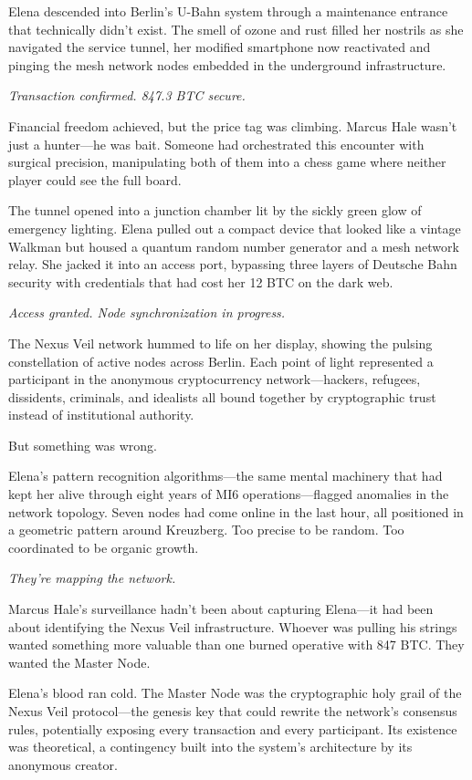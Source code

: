 \documentclass[12pt,letterpaper]{book}
\begin{document}
Elena descended into Berlin's U-Bahn system through a maintenance entrance that technically didn't exist. The smell of ozone and rust filled her nostrils as she navigated the service tunnel, her modified smartphone now reactivated and pinging the mesh network nodes embedded in the underground infrastructure.

\emph{Transaction confirmed. 847.3 BTC secure.}

Financial freedom achieved, but the price tag was climbing. Marcus Hale wasn't just a hunter---he was bait. Someone had orchestrated this encounter with surgical precision, manipulating both of them into a chess game where neither player could see the full board.

The tunnel opened into a junction chamber lit by the sickly green glow of emergency lighting. Elena pulled out a compact device that looked like a vintage Walkman but housed a quantum random number generator and a mesh network relay. She jacked it into an access port, bypassing three layers of Deutsche Bahn security with credentials that had cost her 12 BTC on the dark web.

\emph{Access granted. Node synchronization in progress.}

The Nexus Veil network hummed to life on her display, showing the pulsing constellation of active nodes across Berlin. Each point of light represented a participant in the anonymous cryptocurrency network---hackers, refugees, dissidents, criminals, and idealists all bound together by cryptographic trust instead of institutional authority.

But something was wrong.

Elena's pattern recognition algorithms---the same mental machinery that had kept her alive through eight years of MI6 operations---flagged anomalies in the network topology. Seven nodes had come online in the last hour, all positioned in a geometric pattern around Kreuzberg. Too precise to be random. Too coordinated to be organic growth.

\emph{They're mapping the network.}

Marcus Hale's surveillance hadn't been about capturing Elena---it had been about identifying the Nexus Veil infrastructure. Whoever was pulling his strings wanted something more valuable than one burned operative with 847 BTC. They wanted the Master Node.

Elena's blood ran cold. The Master Node was the cryptographic holy grail of the Nexus Veil protocol---the genesis key that could rewrite the network's consensus rules, potentially exposing every transaction and every participant. Its existence was theoretical, a contingency built into the system's architecture by its anonymous creator.
\end{document}
